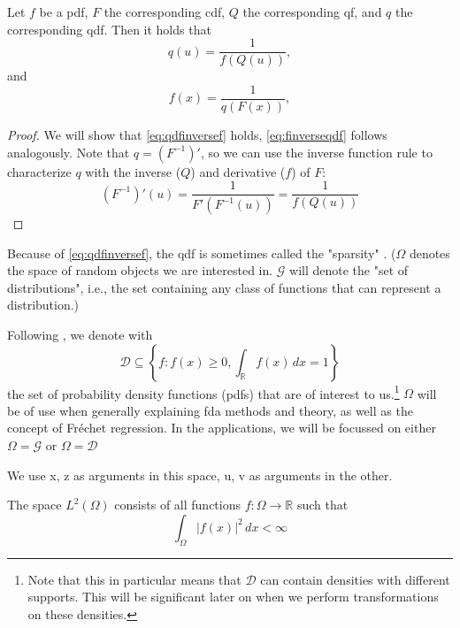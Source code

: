\begin{lemma}
\label{lemma:f eq inverse qdf}
    Let \(f\) be a pdf, \(F\) the corresponding cdf, \(Q\) the corresponding qf, and
    \(q\) the corresponding qdf. Then it holds that
    \begin{equation}
    \label{eq:qdfinversef}
        {q}(u) = \frac{1}{{f}({Q}(u))},
    \end{equation}
    and
    \begin{equation}
    \label{eq:finverseqdf}
        {f}(x) = \frac{1}{{q}({F}(x))},
    \end{equation}
\end{lemma}
\begin{proof}
    We will show that \eqref{eq:qdfinversef} holds, \eqref{eq:finverseqdf} follows
    analogously. Note that \( q = (F^{-1})' \), so we can use the inverse function
    rule to characterize \(q \) with the inverse ($Q$) and derivative ($f$) of \( F \):
    \begin{equation}
    \label{eq:proof_qdfinversef}
        (F^{-1})'(u) = \frac{1}{{F'}({F^{-1}}(u))} = \frac{1}{{f}({Q}(u))}
    \end{equation}
\end{proof}

Because of \eqref{eq:qdfinversef}, the qdf is sometimes called the "sparsity"
\parencite[cf.][]{Tukey1965}.
($\Omega$ denotes the space of random objects
we are interested in. $\mathcal{G}$ will denote the "set of distributions", i.e., the set containing
any class of functions that can represent a distribution.)

Following \textcite{PetersenZhangKokoszka2022}, we denote with
\begin{equation*}
    \mathcal{D} \subseteq \left\{ f : f(x) \geq 0, \int_{\mathbb{R}} f(x) \, dx = 1 \right\}
\end{equation*}
the set of probability density functions (pdfs) that are of interest to us.\footnote{Note that
this in particular means that $\mathcal{D}$ can contain densities with different supports.
This will be significant later on when we perform transformations on these densities.}
$\Omega$ will be of use when generally explaining fda methods and theory, as well as
the concept of Fréchet regression. In the applications, we will be focussed on either
$\Omega = \mathcal{G}$ or $\Omega = \mathcal{D}$

We use x, z as arguments in this space, u, v as arguments in the other.



\begin{definition}[$L^2$]
    The space \( L^2(\Omega) \) consists of all functions \( f: \Omega \to \mathbb{R} \) such that
    \[
    \int_{\Omega} |f(x)|^2 \, dx < \infty
    \]
\end{definition}


